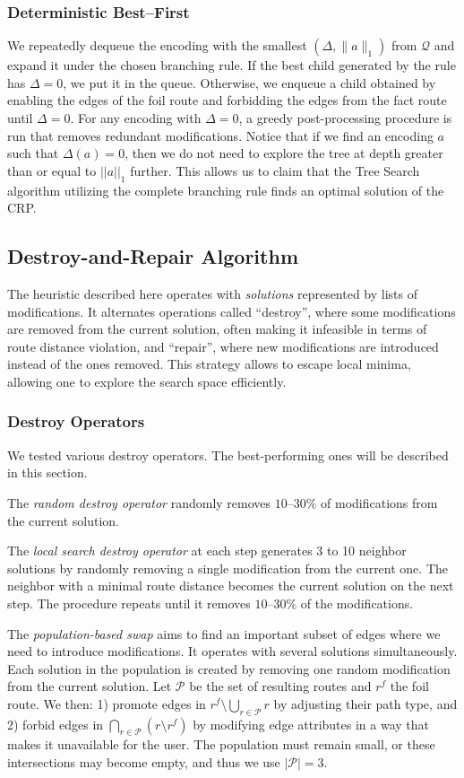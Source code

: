 \documentclass{article}
\begin{document}
\subsubsection{Deterministic Best–First}
We repeatedly dequeue the encoding with the smallest $(\Delta,\|a\|_1)$ from $\mathcal Q$ and expand it under the chosen branching rule.  
If the best child generated by the rule has $\Delta = 0$, we put it in the queue. 
Otherwise, we enqueue a child obtained by enabling the edges of the foil route and forbidding the edges from the fact route until $\Delta=0$.  
For any encoding with $\Delta=0$, a greedy post-processing procedure is run that removes redundant modifications.  
Notice that if we find an encoding $a$ such that $\Delta(a) = 0$, then we do not need to explore the tree at depth greater than or equal to $||a||_1$ further.
This allows us to claim that the Tree Search algorithm utilizing the complete branching rule finds an optimal solution of the CRP.

\subsection{Destroy-and-Repair Algorithm}
The heuristic described here operates with \textit{solutions} represented by lists of modifications.  
It alternates operations called ``destroy'', where some modifications are removed from the current solution, often making it infeasible in terms of route distance violation, and ``repair'', where new modifications are introduced instead of the ones removed.
This strategy allows to escape local minima, allowing one to explore the search space efficiently. 

\subsubsection{Destroy Operators}
We tested various destroy operators. 
The best-performing ones will be described in this section.

The \textit{random destroy operator} randomly removes $10$--$30\%$ of modifications from the current solution. 

The \textit{local search destroy operator} at each step generates 3 to 10 neighbor solutions by randomly removing a single modification from the current one. 
The neighbor with a minimal route distance becomes the current solution on the next step. 
The procedure repeats until it removes $10$--$30\%$ of the modifications. 

The \textit{population-based swap} aims to find an important subset of edges where we need to introduce modifications. 
It operates with several solutions simultaneously. 
Each solution in the population is created by removing one random modification from the current solution. 
Let $\mathcal{P}$ be the set of resulting routes and $r^f$ the foil route. 
We then: 1) promote edges in 
$
    r^f \setminus \bigcup_{r \in \mathcal{P}} r
$
by adjusting their path type, and 2) forbid edges in 
$
    \bigcap_{r \in \mathcal{P}} \left(r \setminus r^f\right)
$
by modifying edge attributes in a way that makes it unavailable for the user. 
The population must remain small, or these intersections may become empty, and thus we use $|\mathcal{P}| = 3$.
\end{document}
